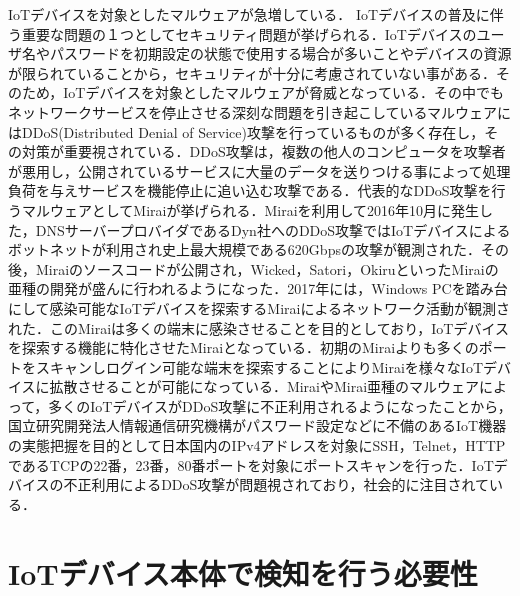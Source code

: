 IoTデバイスを対象としたマルウェアが急増している．
IoTデバイスの普及に伴う重要な問題の１つとしてセキュリティ問題が挙げられる．IoTデバイスのユーザ名やパスワードを初期設定の状態で使用する場合が多いことやデバイスの資源が限られていることから，セキュリティが十分に考慮されていない事がある．そのため，IoTデバイスを対象としたマルウェアが脅威となっている．その中でもネットワークサービスを停止させる深刻な問題を引き起こしているマルウェアにはDDoS(Distributed Denial of Service)攻撃を行っているものが多く存在し，その対策が重要視されている．DDoS攻撃は，複数の他人のコンピュータを攻撃者が悪用し，公開されているサービスに大量のデータを送りつける事によって処理負荷を与えサービスを機能停止に追い込む攻撃である．代表的なDDoS攻撃を行うマルウェアとしてMirai\cite{Mirai}が挙げられる．Miraiを利用して2016年10月に発生した，DNSサーバープロバイダであるDyn社へのDDoS攻撃ではIoTデバイスによるボットネットが利用され史上最大規模である620Gbpsの攻撃が観測された\cite{Dyn}．その後，Miraiのソースコード\cite{code}が公開され，Wicked\cite{Wicked}，Satori\cite{Satori}，Okiru\cite{Okiru}といったMiraiの亜種の開発が盛んに行われるようになった．2017年には，Windows PCを踏み台にして感染可能なIoTデバイスを探索するMiraiによるネットワーク活動が観測された\cite{newMirai}．このMiraiは多くの端末に感染させることを目的としており，IoTデバイスを探索する機能に特化させたMiraiとなっている．初期のMiraiよりも多くのポートをスキャンしログイン可能な端末を探索することによりMiraiを様々なIoTデバイスに拡散させることが可能になっている．MiraiやMirai亜種のマルウェアによって，多くのIoTデバイスがDDoS攻撃に不正利用されるようになったことから，国立研究開発法人情報通信研究機構がパスワード設定などに不備のあるIoT機器の実態把握を目的として日本国内のIPv4アドレスを対象にSSH，Telnet，HTTPであるTCPの22番，23番，80番ポートを対象にポートスキャンを行った\cite{国立}．IoTデバイスの不正利用によるDDoS攻撃が問題視されており，社会的に注目されている．

\section{IoTデバイス本体で検知を行う必要性}

